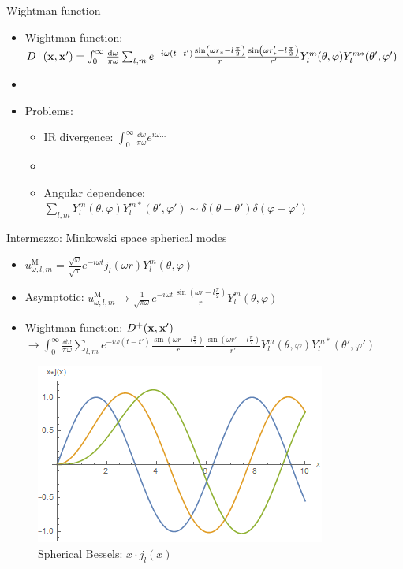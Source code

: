 \documentclass{beamer}
\newcommand{\upd}[1]{^\mathrm{#1}}
\begin{document}
\begin{frame}{Wightman function}
\begin{itemize}
	\item Wightman function: \(D^+(\vb{x}, \vb{x}') = \int_0^\infty \frac{\dd{\omega}}{\pi\omega} \sum_{l,m} e^{-i\omega(t-t')} \frac{\sin(\omega r_* - l\frac{\pi}{2})}{r} \frac{\sin(\omega r_*' - l\frac{\pi}{2})}{r'} Y_l^m(\theta,\varphi) Y_l^{m*}(\theta',\varphi')\)
	\item[]
	\item Problems:
		\begin{itemize}
			\item IR divergence: \(\int_0^\infty \frac{\dd{\omega}}{\pi\omega} e^{i\omega\dots}\)
			\item[]
			\item Angular dependence: \(\sum_{l,m} Y_l^m(\theta,\varphi) Y_l^{m*}(\theta',\varphi') \sim \delta(\theta-\theta')\delta(\varphi-\varphi')\)
		\end{itemize}
\end{itemize}
\end{frame}

\begin{frame}{Intermezzo: Minkowski space spherical modes}
\begin{itemize}
	\item \(u_{\omega,l,m}\upd{M} = \frac{\sqrt{\omega}}{\sqrt{\pi}} e^{- i \omega t} j_l(\omega r) Y_l^m(\theta,\varphi)\)
	\item Asymptotic: \(u_{\omega,l,m}\upd{M} \to \frac{1}{\sqrt{\pi\omega}} e^{- i \omega t} \frac{\sin(\omega r - l\frac{\pi}{2})}{r} Y_l^m(\theta,\varphi)\)
	\item Wightman function: \(D^+(\vb{x},\vb{x}')\)
	\(\to \int_0^\infty \frac{\dd{\omega}}{\pi\omega} \sum_{l,m} e^{-i\omega(t-t')} \frac{\sin(\omega r - l\frac{\pi}{2})}{r} \frac{\sin(\omega r' - l\frac{\pi}{2})}{r'} Y_l^m(\theta,\varphi) Y_l^{m*}(\theta',\varphi')\)
\end{itemize}
\begin{figure}
\centering
\includegraphics[scale=0.5]{plot/sphericalbessel.png}
\caption{Spherical Bessels: \(x\cdot j_l(x)\)}
\end{figure}
\end{frame}
\end{document}
